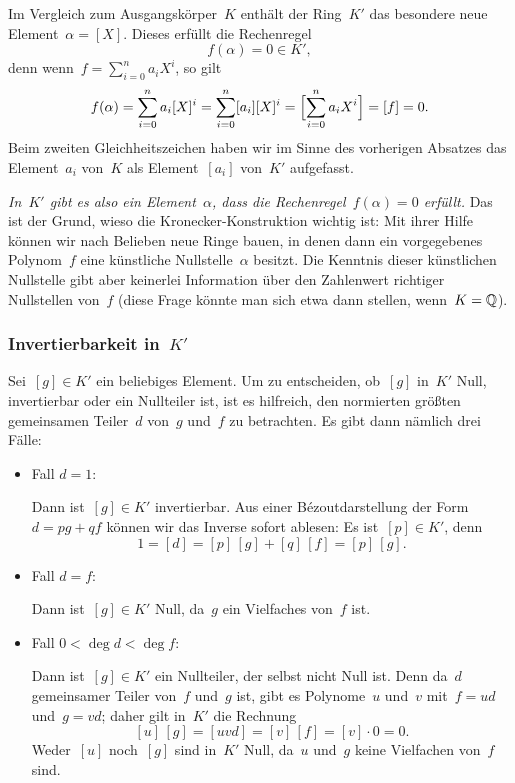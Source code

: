 \documentclass{../../alg2/algblatt}
\begin{document}
Im Vergleich zum Ausgangskörper~$K$ enthält der Ring~$K'$ das besondere neue
Element~$\alpha = [X]$. Dieses erfüllt die Rechenregel
\[ f(\alpha) = 0 \in K', \]
denn wenn~$f = \sum_{i=0}^n a_i X^i$, so gilt
\[ f(\alpha) = \sum_{i=0}^n a_i [X]^i = \sum_{i=0}^n [a_i] [X]^i =
  \Bigl[\sum_{i=0}^n a_i X^i\Bigr] = [f] = 0. \]
Beim zweiten Gleichheitszeichen haben wir im Sinne des vorherigen Absatzes das
Element~$a_i$ von~$K$ als Element~$[a_i]$ von~$K'$ aufgefasst.

\emph{In~$K'$ gibt es also ein Element~$\alpha$, dass die
Rechenregel~$f(\alpha) = 0$ erfüllt.} Das ist der Grund, wieso die
Kronecker-Konstruktion wichtig ist: Mit ihrer Hilfe können wir
nach Belieben neue Ringe bauen, in denen dann ein vorgegebenes Polynom~$f$ eine
künstliche Nullstelle~$\alpha$ besitzt. Die Kenntnis dieser künstlichen
Nullstelle gibt aber keinerlei Information über den Zahlenwert richtiger
Nullstellen von~$f$ (diese Frage könnte man sich etwa dann stellen, wenn~$K =
\mathbb{Q}$).


\subsubsection*{Invertierbarkeit in~$K'$}

Sei~$[g] \in K'$ ein beliebiges Element. Um zu entscheiden, ob~$[g]$ in~$K'$
Null, invertierbar oder ein Nullteiler ist, ist es hilfreich, den normierten
größten gemeinsamen Teiler~$d$ von~$g$ und~$f$ zu betrachten. Es gibt dann
nämlich drei Fälle:
\begin{itemize}
\item Fall $d = 1$:

Dann ist~$[g] \in K'$ invertierbar. Aus einer
Bézoutdarstellung der Form~$d = pg + qf$ können wir das Inverse sofort ablesen:
Es ist~$[p] \in K'$, denn
\[ 1 = [d] = [p]\,[g] + [q]\,[f] = [p]\,[g]. \]

\item Fall $d = f$:

Dann ist~$[g] \in K'$ Null, da~$g$ ein Vielfaches von~$f$
ist.

\item Fall $0 < \deg d < \deg f$:

Dann ist~$[g] \in K'$ ein Nullteiler, der
selbst nicht Null ist. Denn da~$d$ gemeinsamer Teiler von~$f$ und~$g$ ist, gibt
es Polynome~$u$ und~$v$ mit~$f = ud$ und~$g = vd$; daher gilt in~$K'$ die
Rechnung
\[ [u]\,[g] = [uvd] = [v]\,[f] = [v]\cdot0 = 0. \]
Weder~$[u]$ noch~$[g]$ sind in~$K'$ Null, da~$u$ und~$g$ keine Vielfachen
von~$f$ sind.
\end{itemize}
\end{document}
